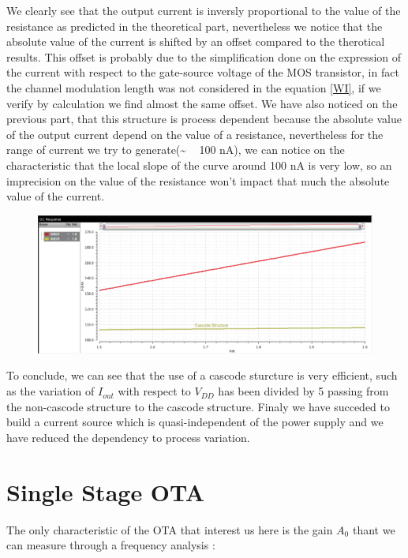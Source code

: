 \documentclass[11pt,a4paper]{report}
\begin{document}
We clearly see that the output current is inversly proportional to the value of the resistance as predicted in the theoretical part, nevertheless we notice that the absolute value of the current is shifted by an offset compared to the therotical results. This offset is probably due to the simplification done on the expression of the current with respect to the gate-source voltage of the MOS transistor, in fact the channel modulation length was not considered in the equation \ref{WI}, if we verify by calculation we find almost the same offset.
We have also noticed on the previous part, that this structure is process dependent because the absolute value of the output current depend on the value of a resistance, nevertheless for the range of current we try to generate(\~ ~ 100 nA), we can notice on the characteristic that the local slope of the curve around 100 nA is very low, so an imprecision on the value of the resistance won't impact that much the absolute value of the current.

\newpage

\begin{figure}[h]
  \begin{center}
    \includegraphics[scale=0.35]{photo/simu_casc}
  \end{center}
\end{figure}

To conclude, we can see that the use of a cascode sturcture is very efficient, such as the variation of $I_{out}$ with respect to $V_{DD}$ has been divided by 5 passing from the non-cascode structure to the cascode structure.
Finaly we have succeded to build a current source which is quasi-independent of the power supply and we have reduced the dependency to process variation.


\section{Single Stage OTA}

The only characteristic of the OTA that interest us here is the gain $A_0$ thant we can measure through a frequency analysis :
\end{document}
